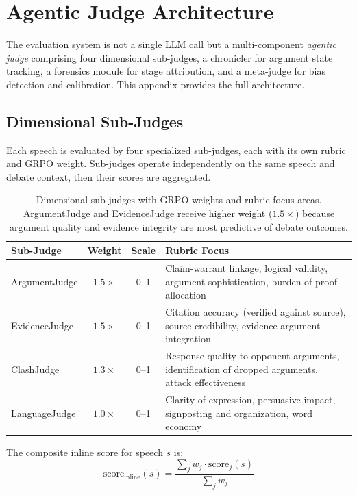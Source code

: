 \section{Agentic Judge Architecture}
\label{app:agentic_judge}

The evaluation system is not a single LLM call but a multi-component
\emph{agentic judge} comprising four dimensional sub-judges, a chronicler
for argument state tracking, a forensics module for stage attribution,
and a meta-judge for bias detection and calibration. This appendix
provides the full architecture.

\subsection{Dimensional Sub-Judges}

Each speech is evaluated by four specialized sub-judges, each with its
own rubric and GRPO weight. Sub-judges operate independently on the
same speech and debate context, then their scores are aggregated.

\begin{table}[h]
\centering
\small
\begin{tabular}{lccp{5.5cm}}
\toprule
\textbf{Sub-Judge} & \textbf{Weight} & \textbf{Scale} & \textbf{Rubric Focus} \\
\midrule
ArgumentJudge & $1.5\times$ & 0--1 & Claim-warrant linkage, logical validity, argument sophistication, burden of proof allocation \\
EvidenceJudge & $1.5\times$ & 0--1 & Citation accuracy (verified against source), source credibility, evidence-argument integration \\
ClashJudge & $1.3\times$ & 0--1 & Response quality to opponent arguments, identification of dropped arguments, attack effectiveness \\
LanguageJudge & $1.0\times$ & 0--1 & Clarity of expression, persuasive impact, signposting and organization, word economy \\
\bottomrule
\end{tabular}
\caption{Dimensional sub-judges with GRPO weights and rubric focus areas.
ArgumentJudge and EvidenceJudge receive higher weight ($1.5\times$) because
argument quality and evidence integrity are most predictive of debate outcomes.}
\label{tab:sub_judges}
\end{table}

The composite inline score for speech $s$ is:
\begin{equation}
\text{score}_{\text{inline}}(s) = \frac{\sum_{j} w_j \cdot \text{score}_j(s)}{\sum_{j} w_j}
\end{equation}

